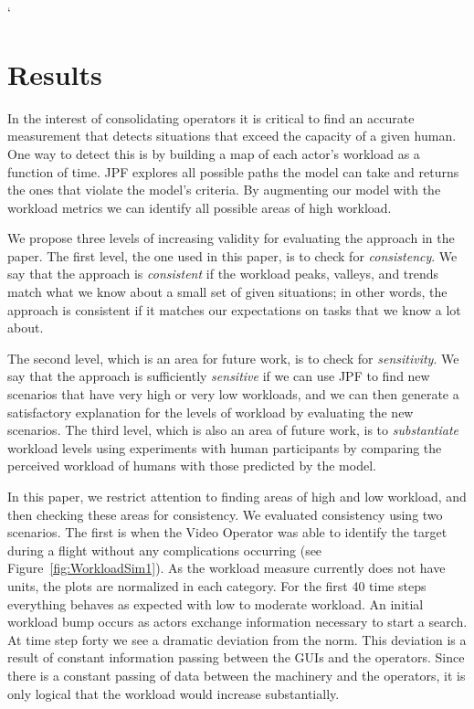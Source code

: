 `\section{Results}
In the interest of consolidating operators it is critical to find an accurate measurement that detects situations that exceed the capacity of a given human. One way to detect this is by building a map of each actor's workload as a function of time. JPF explores all possible paths the model can take and returns the ones that violate the model's criteria. By augmenting our model with the workload metrics we can identify all possible areas of high workload. 

We propose three levels of increasing validity for evaluating the approach in the paper.  The first level, the one used in this paper, is to check for {\em consistency}.  We say that the approach is {\em consistent} if the workload peaks, valleys, and trends match what we know about a small set of given situations; in other words, the approach is consistent if it matches our expectations on tasks that we know a lot about.  

The second level, which is an area for future work, is to check for {\em sensitivity}.  We say that  the approach is sufficiently {\em sensitive} if we can use JPF to find new scenarios that have very high or very low workloads, and we can then generate a satisfactory explanation for the levels of workload by evaluating the new scenarios.  The third level, which is also an area of future work, is to {\em substantiate} workload levels using experiments with human participants by comparing the perceived workload of humans with those predicted by the model.

In this paper, we restrict attention to finding areas of high and low workload, and then checking these areas for consistency.  We evaluated consistency using two scenarios.  The first is when the Video Operator was able to identify the target during a flight without any complications occurring (see Figure~\ref{fig:WorkloadSim1}). As the workload measure currently does not have units, the plots are normalized in each category. For the first 40 time steps everything behaves as expected with low to moderate workload. An initial workload bump occurs as actors exchange information necessary to start a search.   At time step forty we see a dramatic deviation from the norm. This deviation is a result of constant information passing between the GUIs and the operators. Since there is a constant passing of data between the machinery and the operators, it is only logical that the workload would increase substantially.

